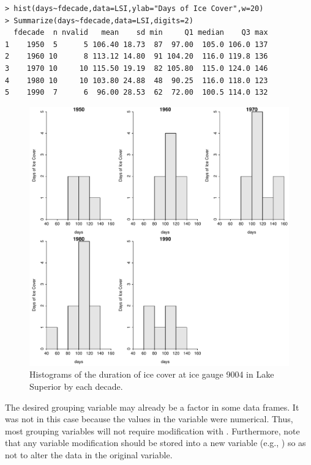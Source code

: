 \documentclass[10pt,openany]{book}\usepackage[]{graphicx}\usepackage[]{color}
\makeatletter
\newenvironment{kframe}{%
 \def\at@end@of@kframe{}%
 \ifinner\ifhmode%
  \def\at@end@of@kframe{\end{minipage}}%
  \begin{minipage}{\columnwidth}%
 \fi\fi%
 \def\FrameCommand##1{\hskip\@totalleftmargin \hskip-\fboxsep
 \colorbox{shadecolor}{##1}\hskip-\fboxsep
     \hskip-\linewidth \hskip-\@totalleftmargin \hskip\columnwidth}%
 \MakeFramed {\advance\hsize-\width
   \@totalleftmargin\z@ \linewidth\hsize
   \@setminipage}}%
 {\par\unskip\endMakeFramed%
 \at@end@of@kframe}
\newenvironment{knitrout}{}{} %
\makeatother
\begin{document}
\begin{knitrout}
\color{fgcolor}\begin{kframe}
\begin{verbatim}
> hist(days~fdecade,data=LSI,ylab="Days of Ice Cover",w=20)
> Summarize(days~fdecade,data=LSI,digits=2)
  fdecade  n nvalid   mean    sd min     Q1 median    Q3 max
1    1950  5      5 106.40 18.73  87  97.00  105.0 106.0 137
2    1960 10      8 113.12 14.80  91 104.20  116.0 119.8 136
3    1970 10     10 115.50 19.19  82 105.80  115.0 124.0 146
4    1980 10     10 103.80 24.88  48  90.25  116.0 118.0 123
5    1990  7      6  96.00 28.53  62  72.00  100.5 114.0 132
\end{verbatim}
\end{kframe}\begin{figure}[hbtp]

{\centering \includegraphics[width=.8\linewidth]{Figs/mhist1-1} 

}

\caption[Histograms of the duration of ice cover at ice gauge 9004 in Lake Superior by each decade]{Histograms of the duration of ice cover at ice gauge 9004 in Lake Superior by each decade.}\label{fig:mhist1}
\end{figure}


\end{knitrout}

The desired grouping variable may already be a factor in some data frames.  It was not in this case because the values in the  variable were numerical.  Thus, most grouping variables will not require modification with .  Furthermore, note that any variable modification should be stored into a new variable (e.g., ) so as not to alter the data in the original variable.
\end{document}
